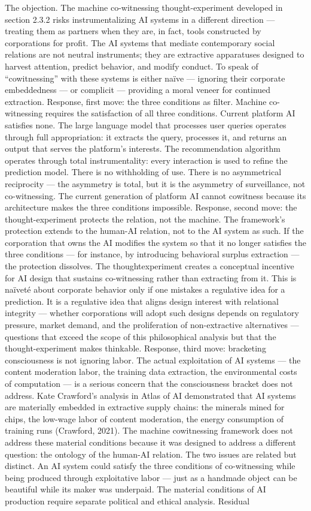 The objection. The machine co-witnessing thought-experiment developed in section 2.3.2 risks instrumentalizing AI systems in a different direction — treating them as partners when they are, in fact, tools constructed by corporations for profit. The AI systems that mediate contemporary social relations are not neutral instruments; they are extractive apparatuses designed to harvest attention, predict behavior, and modify conduct. To speak of “cowitnessing” with these systems is either naïve — ignoring their corporate embeddedness — or complicit — providing a moral veneer for continued extraction. Response, first move: the three conditions as filter. Machine co-witnessing requires the satisfaction of all three conditions. Current platform AI satisfies none. The large language model that processes user queries operates through full appropriation: it extracts the query, processes it, and returns an output that serves the platform’s interests. The recommendation algorithm operates through total instrumentality: every interaction is used to refine the prediction model. There is no withholding of use. There is no asymmetrical reciprocity — the asymmetry is total, but it is the asymmetry of surveillance, not co-witnessing. The current generation of platform AI cannot cowitness because its architecture makes the three conditions impossible. Response, second move: the thought-experiment protects the relation, not the machine. The framework’s protection extends to the human-AI relation, not to the AI system as such. If the corporation that owns the AI modifies the system so that it no longer satisfies the three conditions — for instance, by introducing behavioral surplus extraction — the protection dissolves. The thoughtexperiment creates a conceptual incentive for AI design that sustains co-witnessing rather than extracting from it. This is naïveté about corporate behavior only if one mistakes a regulative idea for a prediction. It is a regulative idea that aligns design interest with relational integrity — whether corporations will adopt such designs depends on regulatory pressure, market demand, and the proliferation of non-extractive alternatives — questions that exceed the scope of this philosophical analysis but that the thought-experiment makes thinkable. Response, third move: bracketing consciousness is not ignoring labor. The actual exploitation of AI systems — the content moderation labor, the training data extraction, the environmental costs of computation — is a serious concern that the consciousness bracket does not address. Kate Crawford’s analysis in Atlas of AI demonstrated that AI systems are materially embedded in extractive supply chains: the minerals mined for chips, the low-wage labor of content moderation, the energy consumption of training runs (Crawford, 2021). The machine cowitnessing framework does not address these material conditions because it was designed to address a different question: the ontology of the human-AI relation. The two issues are related but distinct. An AI system could satisfy the three conditions of co-witnessing while being produced through exploitative labor — just as a handmade object can be beautiful while its maker was underpaid. The material conditions of AI production require separate political and ethical analysis. Residual 